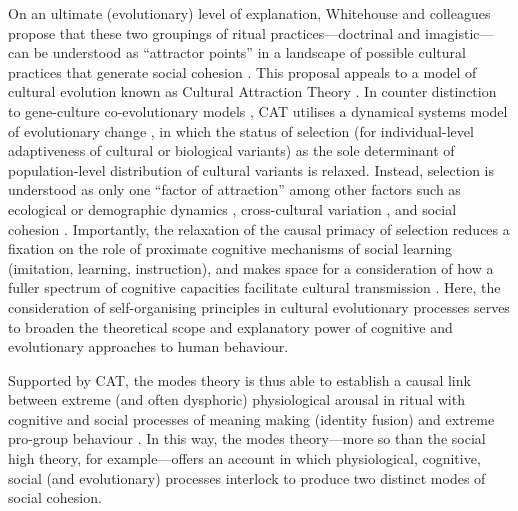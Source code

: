  On an ultimate (evolutionary) level of explanation, Whitehouse and colleagues propose that these two groupings of ritual practices---doctrinal and imagistic---can be understood as ``attractor points'' in a landscape of possible cultural practices that generate social cohesion \citep{Atkinson2011,Whitehouse2014}.  This proposal appeals to a model of cultural evolution known as Cultural Attraction Theory \citep[hereafter CAT; an extension of Sperber's ``epidemiology of representations,'' see][]{Sperber1996,Claidiere2007,Claidiere2014}.  In counter distinction to gene-culture co-evolutionary models \citep[which largely adhere to the selection-driven causation of the MES paradigm][]{Acerbi2015}, CAT utilises a dynamical systems model of evolutionary change \citep[known generally as ``evolutionary systems theory,'' see][]{Badcock2012,Ramstead2017}, in which the status of selection (for individual-level adaptiveness of cultural or biological variants) as the sole determinant of population-level distribution of cultural variants is relaxed.  Instead, selection is understood as only one ``factor of attraction'' \citep{Claidiere2014} among other factors such as ecological or demographic dynamics \citep[such as availability of resources and population size and density, see][]{Henrich2004,Powell2009}, cross-cultural variation \citep{Mesoudi2015}, and social cohesion \citep{Heyes2011}.  Importantly, the relaxation of the causal primacy of selection reduces a fixation on the role of proximate cognitive mechanisms of social learning (imitation, learning, instruction), and makes space for a consideration of how a fuller spectrum of cognitive capacities facilitate cultural transmission \citep{Acerbi2015}. Here, the consideration of self-organising principles in cultural evolutionary processes serves to broaden the theoretical scope and explanatory power of cognitive and evolutionary approaches to human behaviour.

 Supported by CAT, the modes theory is thus able to establish a causal link between extreme (and often dysphoric) physiological arousal in ritual with cognitive and social processes of meaning making (identity fusion) and extreme pro-group behaviour \citep{Whitehouse2014,Whitehouse2017}.  In this way, the modes theory---more so than the social high theory, for example---offers an account in which physiological, cognitive, social (and evolutionary) processes interlock to produce two distinct modes of social cohesion.

